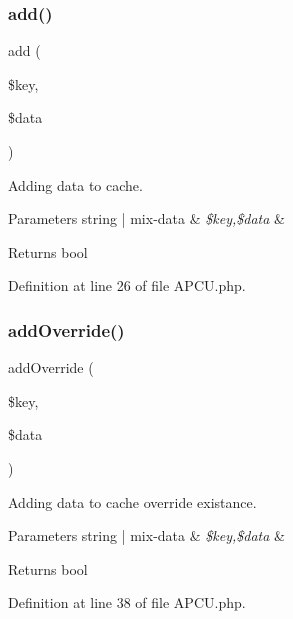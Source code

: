 \subsubsection{\texorpdfstring{add()}{add()}}
{\footnotesize\ttfamily add (\begin{DoxyParamCaption}\item[{}]{\$key,  }\item[{}]{\$data }\end{DoxyParamCaption})}

Adding data to cache.


\begin{DoxyParams}[1]{Parameters}
string | mix-\/data & {\em \$key,\$data} & \\
\hline
\end{DoxyParams}
\begin{DoxyReturn}{Returns}
bool 
\end{DoxyReturn}


Definition at line 26 of file A\+P\+C\+U.\+php.

\mbox{\label{class_zest_1_1_cache_1_1_a_p_c_u_1_1_a_p_c_u_a943b461129dabcd32e99b0516c9c9bc6}} 
\subsubsection{\texorpdfstring{add\+Override()}{addOverride()}}
{\footnotesize\ttfamily add\+Override (\begin{DoxyParamCaption}\item[{}]{\$key,  }\item[{}]{\$data }\end{DoxyParamCaption})}

Adding data to cache override existance.


\begin{DoxyParams}[1]{Parameters}
string | mix-\/data & {\em \$key,\$data} & \\
\hline
\end{DoxyParams}
\begin{DoxyReturn}{Returns}
bool 
\end{DoxyReturn}


Definition at line 38 of file A\+P\+C\+U.\+php.

